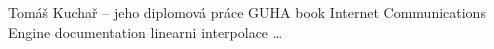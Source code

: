 \documentclass[a4paper,12pt]{book}
\begin{document}


\begin{thebibliography}{thesisKuchar}
 Tomáš Kuchař -- jeho diplomová práce
 GUHA book
 Internet Communications Engine documentation
 linearni interpolace 
 \dots
\end{thebibliography}
\end{document}
